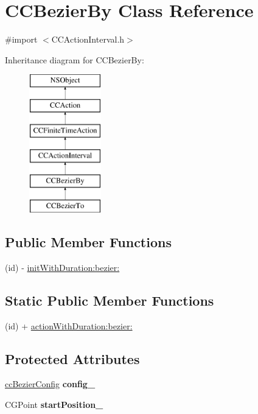 \hypertarget{interface_c_c_bezier_by}{\section{C\-C\-Bezier\-By Class Reference}
\label{interface_c_c_bezier_by}
}


{\ttfamily \#import $<$C\-C\-Action\-Interval.\-h$>$}

Inheritance diagram for C\-C\-Bezier\-By\-:\begin{figure}[H]
\begin{center}
\leavevmode
\includegraphics[height=6.000000cm]{interface_c_c_bezier_by}
\end{center}
\end{figure}
\subsection*{Public Member Functions}
\begin{DoxyCompactItemize}
\item 
(id) -\/ \hyperlink{interface_c_c_bezier_by_adf84b5aa6bdb241348853a6f8cb3af67}{init\-With\-Duration\-:bezier\-:}
\end{DoxyCompactItemize}
\subsection*{Static Public Member Functions}
\begin{DoxyCompactItemize}
\item 
(id) + \hyperlink{interface_c_c_bezier_by_af1ee9e334ba30cc773c2d4ff96f4e565}{action\-With\-Duration\-:bezier\-:}
\end{DoxyCompactItemize}
\subsection*{Protected Attributes}
\begin{DoxyCompactItemize}
\item 
\hypertarget{interface_c_c_bezier_by_a163dcb0b2de57470f9dac8d6a50f71a4}{\hyperlink{struct__cc_bezier_config}{cc\-Bezier\-Config} {\bfseries config\-\_\-}}\label{interface_c_c_bezier_by_a163dcb0b2de57470f9dac8d6a50f71a4}

\item 
\hypertarget{interface_c_c_bezier_by_a93c275a07f74cca1367f75fb2c1d428b}{C\-G\-Point {\bfseries start\-Position\-\_\-}}\label{interface_c_c_bezier_by_a93c275a07f74cca1367f75fb2c1d428b}

\end{DoxyCompactItemize}


